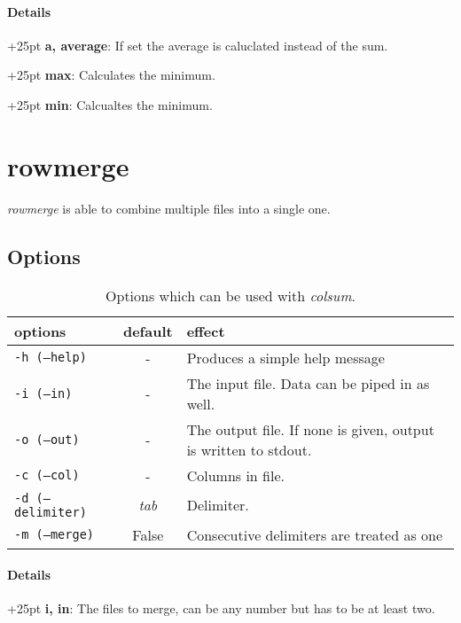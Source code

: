 \documentclass[a4paper,10pt,parskip=half]{scrreprt}
\begin{document}
\subsubsection{Details}

\hangindent+25pt 
\textbf{a, average}: If set the average is caluclated instead of the sum.

\hangindent+25pt 
\textbf{max}: Calculates the minimum.

\hangindent+25pt 
\textbf{min}: Calcualtes the minimum.



\chapter{rowmerge}


\textit{rowmerge} is able to combine multiple files into a single one. 

\section{Options}
\begin{table}[h]
\caption{Options which can be used with \textit{colsum}.}
\begin{tabular}{lcp{7cm}}\hline
options& default & effect \\\hline
 \texttt{-h (--help)}&- & Produces a simple help message\\
 \texttt{-i (--in)} &-& The input file. Data can be piped in as well.\\
 \texttt{-o (--out)} &-& The output file. If none is given, output is written to stdout.\\
 \texttt{-c (--col)} &-& Columns in file.\\
 \texttt{-d (--delimiter)} & \textit{tab} & Delimiter. \\
 \texttt{-m (--merge)} & False & Consecutive delimiters are treated as one

\end{tabular}
\end{table}

\subsubsection{Details}

\hangindent+25pt 
\textbf{i, in}: The files to merge, can be any number but has to be at least
two.
\end{document}
